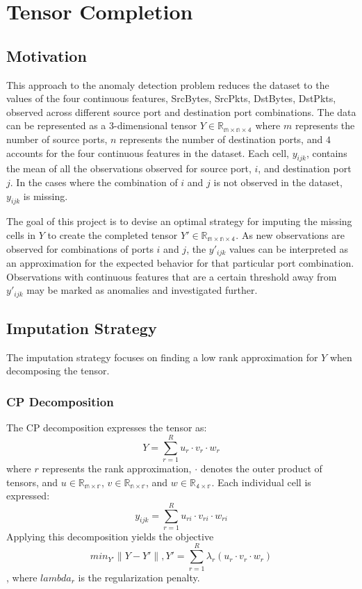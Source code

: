 \documentclass[12pt,twoside]{dukestatscithesis}
\theoremstyle{definition}
\theoremstyle{definition}
\theoremstyle{definition}
\theoremstyle{remark}
\begin{document}
\chapter{Tensor Completion}\label{tensor-completion}

\section{Motivation}\label{motivation-1}

This approach to the anomaly detection problem reduces the dataset to
the values of the four continuous features, SrcBytes, SrcPkts, DstBytes,
DstPkts, observed across different source port and destination port
combinations. The data can be represented as a 3-dimensional tensor
\(Y \in \mathbb{R_{m \times n \times 4}}\) where \(m\) represents the
number of source ports, \(n\) represents the number of destination
ports, and \(4\) accounts for the four continuous features in the
dataset. Each cell, \(y_{ijk}\), contains the mean of all the
observations observed for source port, \(i\), and destination port
\(j\). In the cases where the combination of \(i\) and \(j\) is not
observed in the dataset, \(y_{ijk}\) is missing.

The goal of this project is to devise an optimal strategy for imputing
the missing cells in \(Y\) to create the completed tensor
\(Y' \in \mathbb{R_{m \times n \times 4}}\). As new observations are
observed for combinations of ports \(i\) and \(j\), the \(y'_{ijk}\)
values can be interpreted as an approximation for the expected behavior
for that particular port combination. Observations with continuous
features that are a certain threshold away from \(y'_{ijk}\) may be
marked as anomalies and investigated further.

\section{Imputation Strategy}\label{imputation-strategy}

The imputation strategy focuses on finding a low rank approximation for
\(Y\) when decomposing the tensor.

\subsection{CP Decomposition}\label{cp-decomposition}

The CP decomposition expresses the tensor as:
\[Y = \sum_{r=1}^Ru_r \cdotp v_r \cdotp w_r\] where \(r\) represents the
rank approximation, \(\cdotp\) denotes the outer product of tensors, and
\(u \in \mathbb{R_{m \times r}}\), \(v \in \mathbb{R_{n \times r}}\),
and \(w \in \mathbb{R_{4 \times r}}\). Each individual cell is
expressed: \[y_{ijk} = \sum_{r=1}^Ru_{ri} \cdotp v_{ri} \cdotp w_{ri}\]
Applying this decomposition yields the objective
\[min_{Y'}\|Y-Y'\|, Y' = \sum_{r=1}^R\lambda_r(u_r \cdotp v_r \cdotp w_r)\],
where \(lambda_r\) is the regularization penalty.
\end{document}
